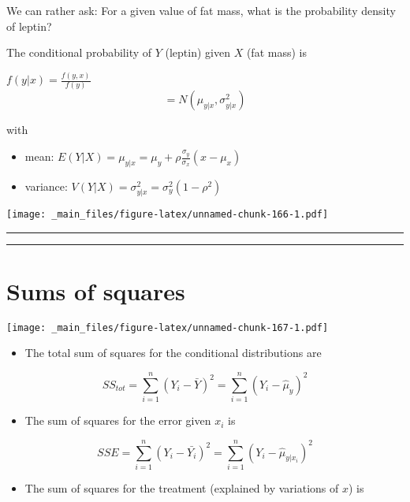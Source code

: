 \documentclass[
]{book}
\providecommand{\tightlist}{%
  \setlength{\itemsep}{0pt}\setlength{\parskip}{0pt}}
\begin{document}
We can rather ask: For a given value of fat mass, what is the probability density of leptin?

The conditional probability of \(Y\) (leptin) given \(X\) (fat mass) is

\(f(y|x)=\frac{f(y,x)}{f(y)}\)
\[=N(\mu_{y|x}, \sigma^2_{y|x})\]

with

\begin{itemize}
\item
  mean: \(E(Y|X)=\mu_{y|x}=\mu_y+\rho\frac{\sigma_y}{\sigma_x}(x-\mu_x)\)
\item
  variance: \(V(Y|X)=\sigma^2_{y|x}= \sigma_y^2(1-\rho^2)\)
\end{itemize}

\texttt{[image: \_main\_files/figure-latex/unnamed-chunk-166-1.pdf]}

\begin{center}\rule{0.5\linewidth}{0.5pt}\end{center}

\begin{center}\rule{0.5\linewidth}{0.5pt}\end{center}

\hypertarget{sums-of-squares}{%
\section{Sums of squares}\label{sums-of-squares}}

\texttt{[image: \_main\_files/figure-latex/unnamed-chunk-167-1.pdf]}

\begin{itemize}
\tightlist
\item
  The total sum of squares for the conditional distributions are
\end{itemize}

\[SS_{tot}=\sum_{i=1}^n(Y_i-\bar{Y})^2=\sum_{i=1}^n(Y_i -\hat{\mu}_y)^2\]

\begin{itemize}
\tightlist
\item
  The sum of squares for the error given \(x_i\) is
\end{itemize}

\[SSE=\sum_{i=1}^n(Y_i-\bar{Y_i})^2=\sum_{i=1}^n(Y_i-\hat{\mu}_{y|x_i})^2\]

\begin{itemize}
\tightlist
\item
  The sum of squares for the treatment (explained by variations of \(x\)) is
\end{itemize}
\end{document}
